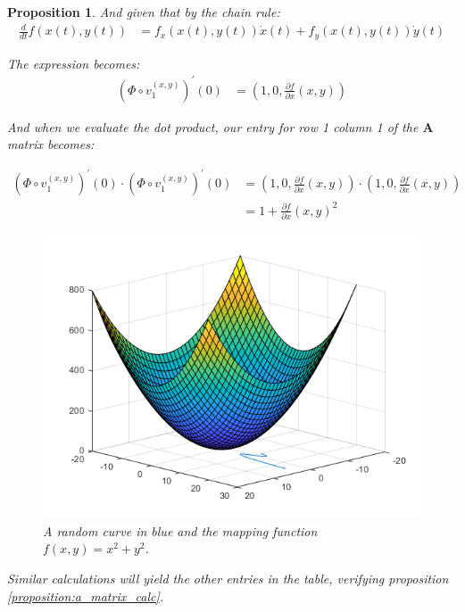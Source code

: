\documentclass[12pt]{article}
\newtheorem{proposition}{Proposition}
\begin{document}
\begin{proposition}
		\noindent And given that by the chain rule:
		\begin{align}
			\frac{d}{dt}f(x(t), y(t)) &= f_x(x(t), y(t))\dot x(t) + f_y(x(t), y(t))\dot y(t)
		\end{align}
		
		\noindent The expression becomes:
		\begin{align}
			(\Phi \circ v_1^{(x, y)})^{\prime}(0) &= (1, 0, \frac{\partial f}{\partial x}(x, y))
		\end{align}
		
		\noindent And when we evaluate the dot product, our entry for row 1 column 1 of the $\bm{A}$ matrix becomes:
		
		\begin{align}
			(\Phi \circ v_1^{(x, y)})^{\prime}(0) \cdot (\Phi \circ v_1^{(x, y)})^{\prime}(0) &=  (1, 0, \frac{\partial f}{\partial x}(x, y)) \cdot (1, 0, \frac{\partial f}{\partial x}(x, y)) \\ &= 1 + \frac{\partial f}{\partial x}(x, y)^2
		\end{align}
		
		\begin{figure}
			\centering
			\includegraphics[scale = 0.6]{mapping.png}
			\caption{A random curve in blue and the mapping function $f(x, y) = x^2 + y^2$.}
			\label{fig:mapping function}
		\end{figure}
		
		\noindent Similar calculations will yield the other entries in the table, verifying proposition \ref{proposition:a_matrix_calc}.
	\end{proposition}
	
\end{document}
